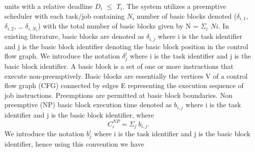 units with a relative deadline \begin{math}D_{i}\end{math} \begin{math}\leq\end{math} \begin{math}T_{i}\end{math}.  The system utilizes a preemptive scheduler with each task/job containing \begin{math}N_{i}\end{math} number of basic blocks denoted (\begin{math}\delta_{i,1}\end{math}, \begin{math}\delta_{i,2}\end{math}, … \begin{math}\delta_{i,N_{i}}\end{math}) with the total number of basic blocks given by N = \begin{math}\Sigma_{i}\end{math} \begin{math}N{i}\end{math}. In existing literature, basic blocks are denoted as \begin{math}\delta_{i,j}\end{math} where i is the task identifier and j is the basic block identifier denoting the basic block position in the control flow graph.  We introduce the notation \begin{math}\delta_{j}^{i}\end{math} where i is the task identifier and j is the basic block identifier. A basic block is a set of one or more instructions that execute non-preemptively.  Basic blocks are essentially the vertices V of a control flow graph (CFG) connected by edges E representing the execution sequence of job instructions. Preemptions are permitted at basic block boundaries.  Non preemptive (NP) basic block execution time denoted as \begin{math}b_{i,j}\end{math} where i is the task identifier and j is the basic block identifier, where
\begin{equation}\label{eqn:c-np1}
    C_{i}^{NP} = \Sigma_{j}\ b_{i,j}.
\end{equation}
\noindent
We introduce the notation \begin{math}b_{j}^{i}\end{math} where i is the task identifier and j is the basic block identifier, hence using this convention we have
